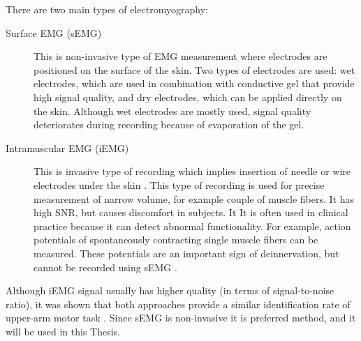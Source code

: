 There are two main types of electromyography: 
\begin{description}
\item[Surface EMG (sEMG)] This is non-invasive type of EMG measurement where electrodes are positioned on the surface of the skin. Two types of electrodes are used: wet electrodes, which are used in combination with conductive gel that provide high signal quality, and dry electrodes, which can be applied directly on the skin. Although wet electrodes are mostly used, signal quality deteriorates during recording because of evaporation of the gel.

\item[Intramuscular EMG (iEMG)] This is invasive type of recording which implies insertion of needle or wire electrodes under the skin \citep{Marateb1999}. This type of recording is used for precise measurement of narrow volume, for example couple of muscle fibers. It has high SNR, but causes discomfort in subjects. It It is often used in clinical practice because it can detect abnormal functionality. For example, action potentials of spontaneously contracting single muscle fibers can be measured. These potentials are an important sign of deinnervation, but cannot be recorded using sEMG \citep{Merletti-book}.
\end{description}

Although iEMG signal usually has higher quality (in terms of signal-to-noise ratio), it was shown that both approaches provide a similar identification rate of upper-arm motor task \citep{Hargrove2007}. Since sEMG is non-invasive it is preferred method, and it will be used in this Thesis.

